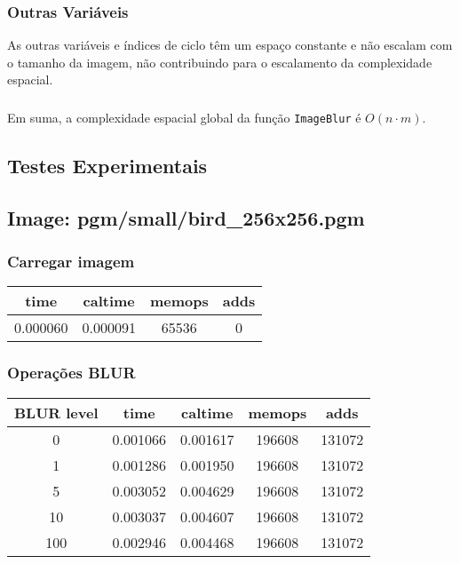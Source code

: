 \documentclass{report}
\begin{document}
\subsubsection{Outras Variáveis}
As outras variáveis e índices de ciclo têm um espaço constante e não escalam com o tamanho da imagem, não contribuindo para o escalamento da 
complexidade espacial.
\par
\subsubsection*{}
Em suma, a complexidade espacial global da função \texttt{ImageBlur} é \(O(n \cdot m)\).

\subsection{Testes Experimentais}

\subsection*{Image: pgm/small/bird\_256x256.pgm}

\subsubsection*{Carregar imagem}
\begin{tabular}{cccc}
\toprule
\textbf{time} & \textbf{caltime} & \textbf{memops} & \textbf{adds} \\
\midrule
0.000060 & 0.000091 & 65536 & 0 \\
\bottomrule
\end{tabular}

\subsubsection*{Operações BLUR}
\begin{tabular}{ccccc}
\toprule
\textbf{BLUR level} & \textbf{time} & \textbf{caltime} & \textbf{memops} & \textbf{adds} \\
\midrule
0 & 0.001066 & 0.001617 & 196608 & 131072 \\
1 & 0.001286 & 0.001950 & 196608 & 131072 \\
5 & 0.003052 & 0.004629 & 196608 & 131072 \\
10 & 0.003037 & 0.004607 & 196608 & 131072 \\
100 & 0.002946 & 0.004468 & 196608 & 131072 \\
\bottomrule
\end{tabular}
\end{document}
